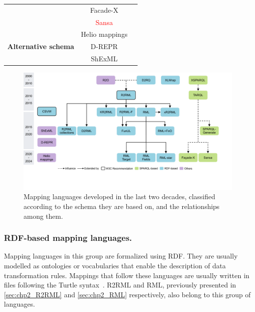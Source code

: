 \begin{table}[t]
{\begin{tabular}{ccc}
                              & Facade-X        & \parencite{asprino2023sparql-anything,sparqlanything}\\ \cmidrule{2-3}
                              & \textcolor{red}{Sansa}            & \parencite{stadler2023spark}\\ \midrule
\multirow{4}{*}{\textbf{Alternative schema}}       & Helio mappings  & \parencite{cimmino2022helio}\\ \cmidrule{2-3} 
                              & D-REPR          & \parencite{Vu2019d-repr}\\ \cmidrule{2-3} 
                              & ShExML          & \parencite{Garcia-Gonzalez2020shexml,shexml}\\  \bottomrule
\end{tabular}}
\end{table}



\begin{figure}[t]
\centering
\includegraphics[width=1\linewidth]{figures/chp2_mapping_languages}
\caption[Existing mapping languages and the relationships among them]{Mapping languages developed in the last two decades, classified according to the schema they are based on, and the relationships among them.}
\label{fig:chp2_mapping_languages}
\end{figure}




\subsubsection{RDF-based mapping languages.} 
\label{sec:chp2_RDF-languages}

Mapping languages in this group are formalized using RDF. They are usually modelled as ontologies or vocabularies that enable the description of data transformation rules. Mappings that follow these languages are usually written in files following the Turtle syntax~\parencite{turtle}. R2RML and RML, previously presented in \cref{sec:chp2_R2RML}
and \cref{sec:chp2_RML} respectively, also belong to this group of languages. 


